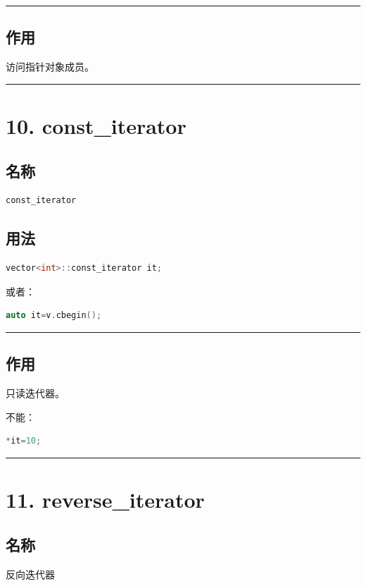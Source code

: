 \documentclass[9pt,twocolumn]{extarticle}
\begin{document}
\noindent\rule{\linewidth}{0.4pt}

\subsection{作用}
访问指针对象成员。

\noindent\rule{\linewidth}{0.4pt}

\section{10. const\_iterator}

\subsection{名称}
\begin{lstlisting}[language=C++]
const_iterator
\end{lstlisting}

\subsection{用法}
\begin{lstlisting}[language=C++]
vector<int>::const_iterator it;
\end{lstlisting}
或者：
\begin{lstlisting}[language=C++]
auto it=v.cbegin();
\end{lstlisting}

\noindent\rule{\linewidth}{0.4pt}

\subsection{作用}
只读迭代器。

不能：
\begin{lstlisting}[language=C++]
*it=10;
\end{lstlisting}

\noindent\rule{\linewidth}{0.4pt}

\section{11. reverse\_iterator}

\subsection{名称}
反向迭代器
\end{document}
